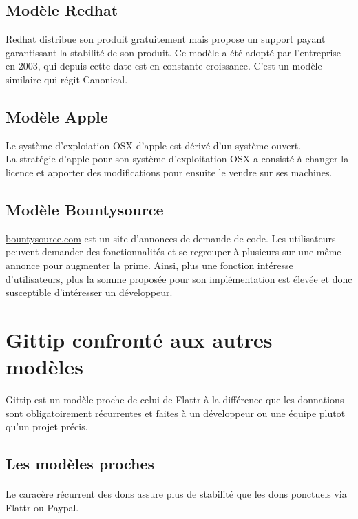     \subsection{Modèle Redhat}

Redhat distribue son produit gratuitement mais propose un support payant
garantissant la stabilité de son produit. Ce modèle a été adopté par
l'entreprise en 2003, qui depuis cette date est en constante croissance.
C'est un modèle similaire qui régit Canonical.

    \subsection{Modèle Apple}

Le système d'exploiation OSX d'apple est dérivé d'un système ouvert.\\
La stratégie d'apple pour son système d'exploitation OSX a consisté à changer la
licence et apporter des modifications pour ensuite le vendre sur ses machines.

    \subsection{Modèle Bountysource}

\url{bountysource.com} est un site d'annonces de demande de code. Les
utilisateurs peuvent demander des fonctionnalités et se regrouper à plusieurs
sur une même annonce pour augmenter la prime. Ainsi, plus une fonction intéresse
d'utilisateurs, plus la somme proposée pour son implémentation est élevée et
donc susceptible d'intéresser un développeur.

\section{Gittip confronté aux autres modèles}

Gittip est un modèle proche de celui de Flattr à la différence que les
donnations sont obligatoirement récurrentes et faites à un développeur ou une
équipe plutot qu'un projet précis.

\subsection{Les modèles proches}

\paragraph{}
Le caracère récurrent des dons assure plus de stabilité que les dons ponctuels
via Flattr ou Paypal.

